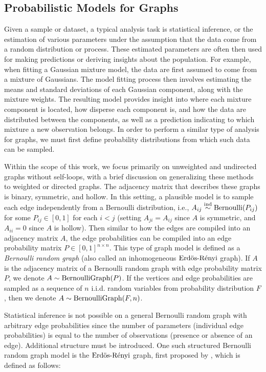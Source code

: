 \documentclass[
  11pt,
]{article}
\theoremstyle{definition}
\theoremstyle{definition}
\theoremstyle{definition}
\theoremstyle{definition}
\theoremstyle{remark}
\begin{document}
\hypertarget{probabilistic-models-for-graphs}{%
\subsection{Probabilistic Models for Graphs}\label{probabilistic-models-for-graphs}}

Given a sample or dataset, a typical analysis task is statistical inference, or the estimation of various parameters under the assumption that the data come from a random distribution or process.
These estimated parameters are often then used for making predictions or deriving insights about the population.
For example, when fitting a Gaussian mixture model, the data are first assumed to come from a mixture of Gaussians.
The model fitting process then involves estimating the means and standard deviations of each Gaussian component, along with the mixture weights.
The resulting model provides insight into where each mixture component is located, how disperse each component is, and how the data are distributed between the components, as well as a prediction indicating to which mixture a new observation belongs.
In order to perform a similar type of analysis for graphs, we must first define probability distributions from which such data can be sampled.

Within the scope of this work, we focus primarily on unweighted and undirected graphs without self-loops, with a brief discussion on generalizing these methods to weighted or directed graphs.
The adjacency matrix that describes these graphs is binary, symmetric, and hollow.
In this setting, a plausible model is to sample each edge independently from a Bernoulli distribution, i.e., \(A_{ij} \stackrel{\mathrm{ind}}{\sim} \mathrm{Bernoulli}(P_{ij})\) for some \(P_{ij} \in [0, 1]\) for each \(i < j\) (setting \(A_{ji} = A_{ij}\) since \(A\) is symmetric, and \(A_{ii} = 0\) since \(A\) is hollow).
Then similar to how the edges are compiled into an adjacency matrix \(A\), the edge probabilities can be compiled into an edge probability matrix \(P \in [0, 1]^{n \times n}\).
This type of graph model is defined as a \emph{Bernoulli random graph} (also called an inhomogeneous \(\text{Erd\"{o}s-R\'{e}nyi}\) graph).
If \(A\) is the adjacency matrix of a Bernoulli random graph with edge probability matrix \(P\), we denote \(A \sim \mathrm{BernoulliGraph}(P)\).
If the vertices and edge probabilities are sampled as a sequence of \(n\) i.i.d. random variables from probability distribution \(F\), then we denote \(A \sim \mathrm{BernoulliGraph}(F, n)\).

Statistical inference is not possible on a general Bernoulli random graph with arbitrary edge probabilities since the number of parameters (individual edge probabilities) is equal to the number of observations (presence or absence of an edge).
Additional structure must be introduced.
One such structured Bernoulli random graph model is the \(\text{Erd\"{o}s-R\'{e}nyi}\) graph, first proposed by \cite{Gilbert:1959}, which is defined as follows:
\end{document}
